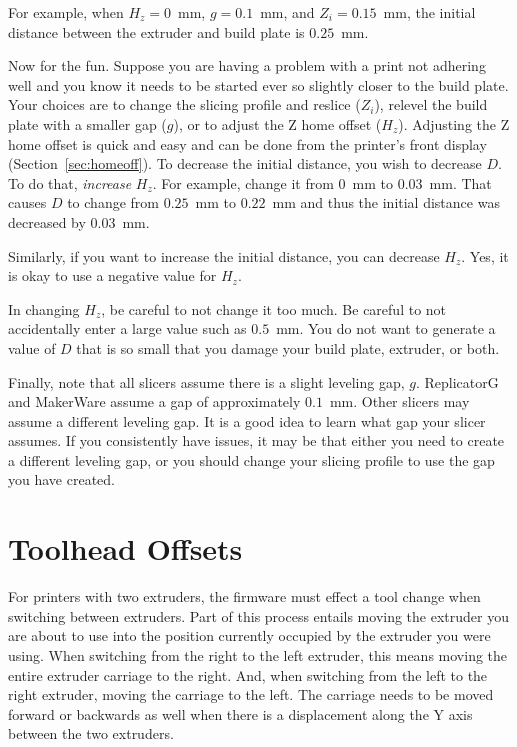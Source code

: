 For example, when $H_z=0$~mm, $g=0.1$~mm, and $Z_i=0.15$~mm, the initial
distance between the extruder and build plate is $0.25$~mm.

Now for the fun.  Suppose you are having a problem with a print not adhering
well and you know it needs to be started ever so slightly closer to the build
plate.  Your choices are to change the slicing profile and reslice ($Z_i$),
relevel the build plate with a smaller gap ($g$), or to adjust the
Z home offset ($H_z$).  Adjusting the Z home offset is quick and easy and
can be done from the printer's front display (Section~\ref{sec:homeoff}).
To decrease the initial distance, you wish to decrease $D$.  To do that,
\emph{increase} $H_z$.  For example, change it from $0$~mm to $0.03$~mm.
That causes $D$ to change from $0.25$~mm to $0.22$~mm and thus the initial
distance was decreased by $0.03$~mm.

Similarly, if you want to increase the initial distance, you can decrease
$H_z$.  Yes, it is okay to use a negative value for $H_z$.

In changing $H_z$, be careful to not change it too much.  Be careful to
not accidentally enter a large value such as $0.5$~mm.  You do not want
to generate a value of $D$ that is so small that you
damage your build plate, extruder, or both.

Finally, note that all slicers assume there is a slight leveling gap, $g$.
ReplicatorG and MakerWare assume a gap of approximately $0.1$~mm.  Other
slicers may assume a different leveling gap.  It is a good idea to learn
what gap your slicer assumes.  If you consistently have issues, it may
be that either you need to create a different leveling gap, or you should change your slicing profile to use the gap you have created.


\section{Toolhead Offsets} \label{sec:toolhead-offsets-detail}

For printers with two extruders, the firmware must effect a tool change when switching between extruders.  Part of this process entails moving the extruder you are about to use into the position currently occupied by the extruder you were using.  When switching from the right to the left extruder, this means moving the entire extruder carriage to the right.  And, when switching from the left to the right extruder, moving the carriage to the left.  The carriage needs to be moved forward or backwards as well when there is a displacement along the Y axis between the two extruders.

